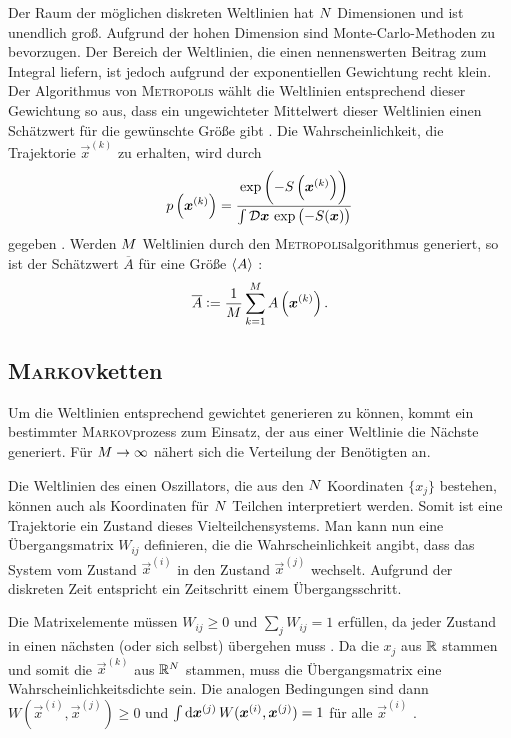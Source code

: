 Der Raum der möglichen diskreten Weltlinien hat $N$ Dimensionen und
ist unendlich groß. Aufgrund der hohen Dimension sind Monte-Carlo-Methoden zu
bevorzugen. Der Bereich der Weltlinien, die einen nennenswerten Beitrag zum
Integral liefern, ist jedoch aufgrund der exponentiellen Gewichtung recht
klein. Der Algorithmus von \textsc{Metropolis} wählt die Weltlinien
entsprechend dieser Gewichtung so aus, dass ein ungewichteter Mittelwert dieser
Weltlinien einen Schätzwert für die gewünschte Größe gibt
\parencite[434]{Creutz/Statistical_Approach_QM}. Die Wahrscheinlichkeit, die
Trajektorie $\vec x^{(k)}$ zu erhalten, wird durch
\begin{equation}
    \label{eq:p_x_k}
    p\del{\vec x^{(k)}} = \frac{\exp\del{-S\del{\vec x^{(k)}}}}{\int
        \funcmeasure
    \, \exp\del{-S(\vec x)}}
\end{equation}
gegeben \parencite[(3.6)]{Creutz/Statistical_Approach_QM}. Werden $M$
Weltlinien durch den \textsc{Metropolis}algorithmus generiert, so ist der
Schätzwert $\overline A$ für eine Größe $\langle A \rangle$
\parencite[(3.7)]{Creutz/Statistical_Approach_QM}:
\[
    \overline A := \frac1\iterations \sum_{k=1}^\iterations A\del{\vec x^{(k)}}.
\]

\subsection{\textsc{Markov}ketten}

Um die Weltlinien entsprechend gewichtet generieren zu können, kommt ein
bestimmter \textsc{Markov}prozess zum Einsatz, der aus einer Weltlinie die
Nächste generiert. Für $M \to \infty$ nähert sich die Verteilung der
Benötigten an. \parencite[434]{Creutz/Statistical_Approach_QM}


Die Weltlinien des einen Oszillators, die aus den $N$ Koordinaten
$\{x_j\}$ bestehen, können auch als Koordinaten für $N$ Teilchen
interpretiert werden. Somit ist eine Trajektorie ein Zustand dieses
Vielteilchensystems. Man kann nun eine Übergangsmatrix $W_{ij}$ definieren, die
die Wahrscheinlichkeit angibt, dass das System vom Zustand $\vec x^{(i)}$ in
den Zustand $\vec x^{(j)}$ wechselt. Aufgrund der diskreten Zeit entspricht ein
Zeitschritt einem Übergangsschritt.

Die Matrixelemente müssen $W_{ij} \geq 0$ und $\sum_j W_{ij} = 1$ erfüllen, da
jeder Zustand in einen nächsten (oder sich selbst) übergehen muss
\parencite[(3.8)]{Creutz/Statistical_Approach_QM}. Da die $x_j$ aus $\mathbb R$
stammen und somit die $\vec x^{(k)}$ aus $\mathbb R^N$ stammen, muss die
Übergangsmatrix eine Wahrscheinlichkeitsdichte sein. Die analogen Bedingungen
sind dann $W(\vec x^{(i)}, \vec x^{(j)}) \geq 0$ und $\int \dif \vec x^{(j)} \,
W(\vec x^{(i)}, \vec x^{(j)}) = 1$ für alle $\vec x^{(i)}$
\parencite[(3.9)]{Creutz/Statistical_Approach_QM}.

